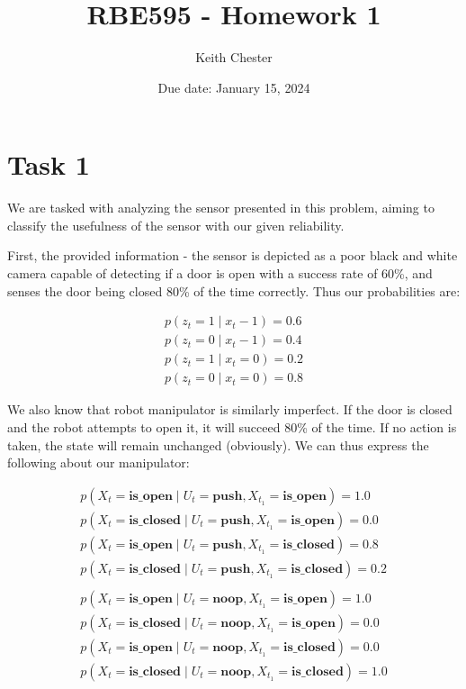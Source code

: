 \documentclass{article}
\title{RBE595 - Homework 1}
\author{Keith Chester}
\date{Due date: January 15, 2024}
\begin{document}
\maketitle

\section*{Task 1}

We are tasked with analyzing the sensor presented in this problem, aiming to classify the usefulness of the sensor with our given reliability.

First, the provided information - the sensor is depicted as a poor black and white camera capable of detecting if a door is open with a success rate of 60\%, and senses the door being closed 80\% of the time correctly. Thus our probabilities are:

\begin{equation}
    \begin{split}
        p(z_t = 1 \mid x_t - 1) = 0.6 \\
        p(z_t = 0 \mid x_t - 1) = 0.4 \\
        p(z_t = 1 \mid x_t = 0) = 0.2 \\
        p(z_t = 0 \mid x_t = 0) = 0.8
    \end{split}
\end{equation}

We also know that robot manipulator is similarly imperfect. If the door is closed and the robot attempts to open it, it will succeed 80\% of the time. If no action is taken, the state will remain unchanged (obviously). We can thus express the following about our manipulator:

\begin{equation}
    \begin{split}
        p(X_t = \textbf{is\_open} \mid U_t = \textbf{push}, X_{t_1} = \textbf{is\_open}) = 1.0 \\
        p(X_t = \textbf{is\_closed} \mid U_t = \textbf{push}, X_{t_1} = \textbf{is\_open}) = 0.0 \\
        p(X_t = \textbf{is\_open} \mid U_t = \textbf{push}, X_{t_1} = \textbf{is\_closed}) = 0.8 \\
        p(X_t = \textbf{is\_closed} \mid U_t = \textbf{push}, X_{t_1} = \textbf{is\_closed}) = 0.2 \\
        \\
        p(X_t = \textbf{is\_open} \mid U_t = \textbf{noop}, X_{t_1} = \textbf{is\_open}) = 1.0 \\
        p(X_t = \textbf{is\_closed} \mid U_t = \textbf{noop}, X_{t_1} = \textbf{is\_open}) = 0.0 \\
        p(X_t = \textbf{is\_open} \mid U_t = \textbf{noop}, X_{t_1} = \textbf{is\_closed}) = 0.0 \\
        p(X_t = \textbf{is\_closed} \mid U_t = \textbf{noop}, X_{t_1} = \textbf{is\_closed}) = 1.0
    \end{split}
\end{equation}
\end{document}
